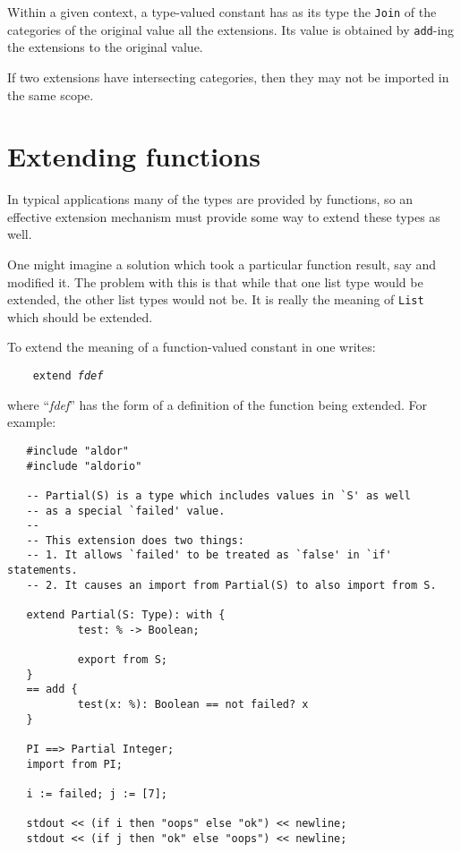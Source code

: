 Within a given context,
a type-valued constant has as its type the \verb"Join" of the
categories of the original value all the extensions.  
Its value is obtained by \verb"add"-ing the extensions to the original value.

If two extensions have intersecting categories, then they may not be
imported in the same scope.

\section{Extending functions}

In typical \asharp{} applications many of the types are provided
by functions, so an effective extension mechanism must provide some way
to extend these types as well.

One might imagine a solution which took a particular function result, say 
 and modified it.  
The problem with this is that while that one list type would be extended,
the other list types would not be.  
It is really the meaning of \verb"List" which should be extended.

To extend the meaning of a function-valued constant in \asharp{}
one writes:

\verb"    "{\tt extend {\em fdef}}

where ``{\em fdef\/}'' has the form of a definition of the function 
being extended.  For example:

\begin{small}
\begin{verbatim}
   #include "aldor"
   #include "aldorio"

   -- Partial(S) is a type which includes values in `S' as well
   -- as a special `failed' value.
   --
   -- This extension does two things:
   -- 1. It allows `failed' to be treated as `false' in `if' statements.
   -- 2. It causes an import from Partial(S) to also import from S.

   extend Partial(S: Type): with {
           test: % -> Boolean;

           export from S;
   }
   == add {
           test(x: %): Boolean == not failed? x
   }

   PI ==> Partial Integer;
   import from PI;

   i := failed; j := [7];

   stdout << (if i then "oops" else "ok") << newline;
   stdout << (if j then "ok" else "oops") << newline;
\end{verbatim}
\end{small}


